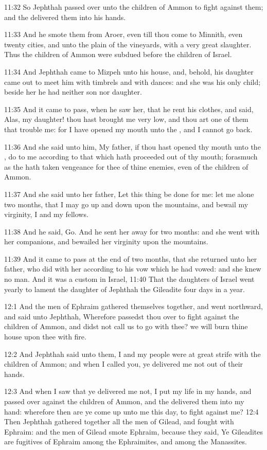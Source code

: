 11:32 So Jephthah passed over unto the children of Ammon to fight against them; and the \LORD delivered them into his hands.

11:33 And he smote them from Aroer, even till thou come to Minnith, even twenty cities, and unto the plain of the vineyards, with a very great slaughter. Thus the children of Ammon were subdued before the children of Israel.

11:34 And Jephthah came to Mizpeh unto his house, and, behold, his daughter came out to meet him with timbrels and with dances: and she was his only child; beside her he had neither son nor daughter.

11:35 And it came to pass, when he saw her, that he rent his clothes, and said, Alas, my daughter! thou hast brought me very low, and thou art one of them that trouble me: for I have opened my mouth unto the \LORD, and I cannot go back.

11:36 And she said unto him, My father, if thou hast opened thy mouth unto the \LORD, do to me according to that which hath proceeded out of thy mouth; forasmuch as the \LORD hath taken vengeance for thee of thine enemies, even of the children of Ammon.

11:37 And she said unto her father, Let this thing be done for me: let me alone two months, that I may go up and down upon the mountains, and bewail my virginity, I and my fellows.

11:38 And he said, Go. And he sent her away for two months: and she went with her companions, and bewailed her virginity upon the mountains.

11:39 And it came to pass at the end of two months, that she returned unto her father, who did with her according to his vow which he had vowed: and she knew no man. And it was a custom in Israel, 11:40 That the daughters of Israel went yearly to lament the daughter of Jephthah the Gileadite four days in a year.

12:1 And the men of Ephraim gathered themselves together, and went northward, and said unto Jephthah, Wherefore passedst thou over to fight against the children of Ammon, and didst not call us to go with thee? we will burn thine house upon thee with fire.

12:2 And Jephthah said unto them, I and my people were at great strife with the children of Ammon; and when I called you, ye delivered me not out of their hands.

12:3 And when I saw that ye delivered me not, I put my life in my hands, and passed over against the children of Ammon, and the \LORD delivered them into my hand: wherefore then are ye come up unto me this day, to fight against me?  12:4 Then Jephthah gathered together all the men of Gilead, and fought with Ephraim: and the men of Gilead smote Ephraim, because they said, Ye Gileadites are fugitives of Ephraim among the Ephraimites, and among the Manassites.

